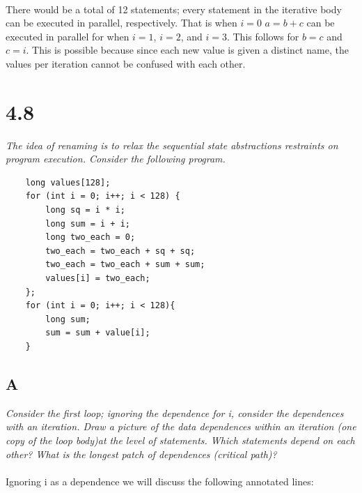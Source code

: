 \documentclass[10pt]{article}
\begin{document}
\paragraph{} There would be a total of 12 statements; every statement in the iterative body can be executed in parallel, respectively. That is when $i = 0$ $a = b + c$ can be executed in parallel for when $i = 1$, $i = 2$, and $i = 3$.
This follows for $b = c$ and $c = i$. This is possible because since each new value is given a distinct name, the values per iteration cannot be confused with each other. 

\section{4.8}
\textit{The idea of renaming is to relax the sequential state abstractions restraints on program execution. Consider the following program.}

\begin{lstlisting}
    long values[128];
    for (int i = 0; i++; i < 128) {
        long sq = i * i;
        long sum = i + i;
        long two_each = 0;
        two_each = two_each + sq + sq;
        two_each = two_each + sum + sum;
        values[i] = two_each;
    };
    for (int i = 0; i++; i < 128){
        long sum;
        sum = sum + value[i];
    }
\end{lstlisting}

\subsection{A}
\textit{Consider the first loop; ignoring the dependence for i, consider the dependences with
an iteration. Draw a picture of the data dependences within an iteration (one copy
of the loop body)at the level of statements. Which statements depend on each other?
What is the longest patch of dependences (critical path)?}
\paragraph{}Ignoring i as a dependence we will discuss the following annotated lines:
\end{document}
